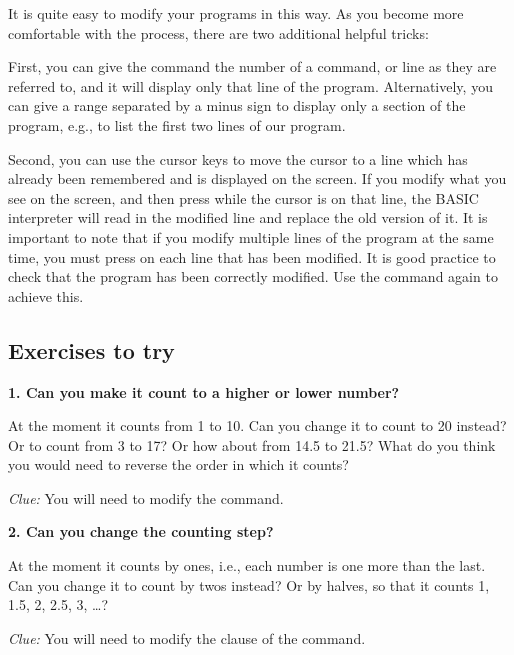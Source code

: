 
It is quite easy to modify your programs in this way.  As you become more comfortable with the process, there are two
additional helpful tricks:

First, you can give the  command the number of a command, or line as they are referred to, and it will display only
that line of the program.  Alternatively, you can give a range separated by a minus sign to display only a section of the program,
e.g.,  to list the first two lines of our program.

Second, you can use the cursor keys to move the cursor to a line which has already been remembered and is displayed on the screen. If you
modify what you see on the screen, and then press  while the cursor is on that line, the BASIC interpreter will
read in the modified line and replace the old version of it.  It is important to note that if you modify multiple lines of the program
at the same time, you must press  on each line that has been modified. It is good practice to check that the
program has been correctly modified. Use the  command again to achieve this.


  \subsection{Exercises to try}

  {\bf 1. Can you make it count to a higher or lower number?}

  At the moment it counts from 1 to 10.  Can you change it to count to 20 instead?  Or to count from 3 to 17?
  Or how about from 14.5 to 21.5? What do you think you would need to reverse the order in which it counts?

  {\em Clue:} You will need to modify the  command.

  {\bf 2. Can you change the counting step?}

  At the moment it counts by ones, i.e., each number is one more than the last.  Can you change it to count by twos
  instead? Or by halves, so that it counts 1, 1.5, 2, 2.5, 3, \ldots?

  {\em Clue:} You will need to modify the  clause
  of the  command.


